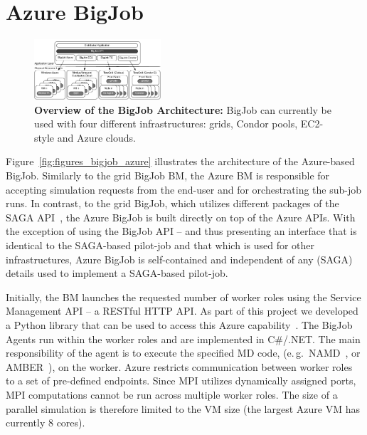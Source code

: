 \documentclass[conference,final]{IEEEtran}
\newcommand{\up}{\vspace*{-1em}}
\newcommand{\alnote}[1]{ {\textcolor{blue} { ***AL: #1 }}}
\newcommand{\jhanote}[1]{ {\textcolor{red} { ***SJ: #1 }}}
\newcommand{\alnote}[1]{}
\newcommand{\jhanote}[1]{}
\begin{document}
\up
\section{Azure BigJob}
\label{sec:bigjob-saga}
\up


\begin{figure}[t]
    \centering
        \includegraphics[width=0.42\textwidth]{figures/distributed_pilot_job}
        \caption{\textbf{Overview of the BigJob Architecture:} BigJob
          can currently be used with four different infrastructures:
          grids, Condor pools, EC2-style and Azure clouds.\up}
    \label{fig:figures_distributed_pilot_job}
\end{figure}

Figure~\ref{fig:figures_bigjob_azure} illustrates the architecture of
the Azure-based BigJob. Similarly to the grid BigJob BM, the Azure BM
is responsible for accepting simulation requests from the end-user and
for orchestrating the sub-job runs.  In contrast, to the grid BigJob,
which utilizes different packages of the SAGA API~\cite{saga_url}, the
Azure BigJob is built directly on top of the Azure APIs. With the
exception of using the BigJob API -- and thus presenting an interface
that is identical to the SAGA-based pilot-job and that which is used
for other infrastructures, Azure BigJob is self-contained and
independent of any (SAGA) details used to implement a SAGA-based
pilot-job.


Initially, the BM launches the requested number of worker
roles %
using the Service Management API -- a RESTful HTTP API.
As part of this project we developed a Python library that can be used
to access this Azure capability~\cite{azure-service-python}. The
BigJob Agents run within the worker roles and are implemented in
C\#/.NET. The main responsibility of the agent is to execute the
specified MD code, (e.\,g.\ NAMD~\cite{Phillips:2005gd}, or
AMBER~\cite{tec2}), on the worker. Azure restricts communication
between worker roles to a set of pre-defined endpoints.
Since MPI utilizes dynamically assigned ports, MPI computations cannot
be run across multiple worker roles.  The size of a parallel
simulation is therefore limited to the VM size (the largest Azure VM
has currently 8 cores).
\end{document}
